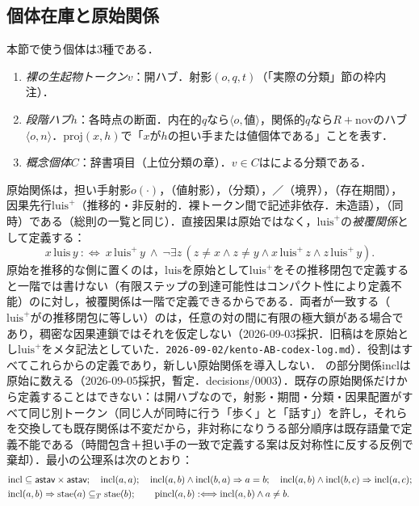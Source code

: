 \documentclass[../../main-detail.tex]{subfiles}
\begin{document}
\subsection{個体在庫と原始関係}
本節で使う個体は3種である．
\begin{enumerate}
    \item \emph{裸の生起物トークン}$v$：開ハブ．射影$(o,q,t)$（「実際の分類」節の枠内注）．
    \item \emph{段階ハブ}$h$：各時点の断面．内在的$q$なら$\langle o,\text{値}\rangle$，関係的$q$なら$R+\mathrm{nov}$のハブ$\langle o,n\rangle$．$\mathrm{proj}(x,h)$で「$x$が$h$の担い手または値個体である」ことを表す．
    \item \emph{概念個体}$C$：辞書項目（上位分類の章）．$v\in C$はによる分類である．
\end{enumerate}
原始関係は，担い手射影$o(\cdot)$，（値射影），（分類），／（境界），（存在期間），因果先行$\mathrm{luis}^{+}$（推移的・非反射的．裸トークン間で記述非依存．未造語），（同時）である（総則の一覧と同じ）．直接因果は原始ではなく，$\mathrm{luis}^{+}$の\emph{被覆関係}として定義する：
\[
 x\,\mathrm{luis}\,y\ :\Longleftrightarrow\ x\,\mathrm{luis}^{+}\,y\ \land\ \lnot\exists z\,(z\neq x\land z\neq y\land x\,\mathrm{luis}^{+}\,z\land z\,\mathrm{luis}^{+}\,y).
\]
原始を推移的な側に置くのは，$\mathrm{luis}$を原始として$\mathrm{luis}^{+}$をその推移閉包で定義すると一階では書けない（有限ステップの到達可能性はコンパクト性により定義不能）のに対し，被覆関係は一階で定義できるからである．両者が一致する（$\mathrm{luis}^{+}$がの推移閉包に等しい）のは，任意の対の間に有限の極大鎖がある場合であり，稠密な因果連鎖ではそれを仮定しない（2026-09-03採択．旧稿はを原始とし$\mathrm{luis}^{+}$をメタ記法としていた．\texttt{2026-09-02/kento-AB-codex-log.md}）．役割はすべてこれらからの定義であり，新しい原始関係を導入しない．
の部分関係$\mathrm{incl}$は原始に数える（2026-09-05採択，暫定．decisions/0003）．既存の原始関係だけから定義することはできない：は開ハブなので，射影・期間・分類・因果配置がすべて同じ別トークン（同じ人が同時に行う「歩く」と「話す」）を許し，それらを交換しても既存関係は不変だから，非対称になりうる部分順序は既存語彙で定義不能である（時間包含＋担い手の一致で定義する案は反対称性に反する反例で棄却）．最小の公理系は次のとおり：
\[
\begin{aligned}
&\mathrm{incl}\subseteq\textsf{astav}\times\textsf{astav};\quad \mathrm{incl}(a,a);\quad \mathrm{incl}(a,b)\land\mathrm{incl}(b,a)\Rightarrow a=b;\quad \mathrm{incl}(a,b)\land\mathrm{incl}(b,c)\Rightarrow\mathrm{incl}(a,c);\\
&\mathrm{incl}(a,b)\Rightarrow \mathrm{stae}(a)\subseteq_T\mathrm{stae}(b);\qquad \mathrm{pincl}(a,b):\Longleftrightarrow \mathrm{incl}(a,b)\land a\neq b.
\end{aligned}
\]
\end{document}
